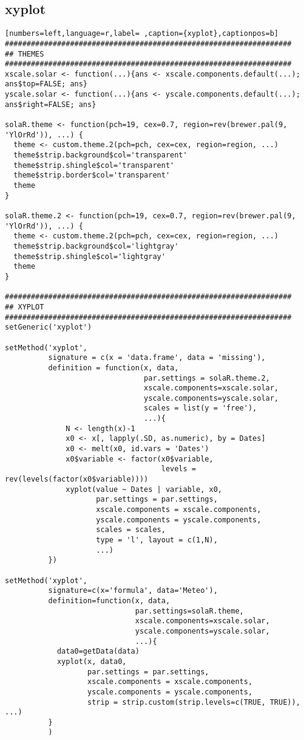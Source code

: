 \subsection{xyplot}
\label{sec:org18348e4}
\begin{lstlisting}[numbers=left,language=r,label= ,caption={xyplot},captionpos=b]
##################################################################
## THEMES
##################################################################
xscale.solar <- function(...){ans <- xscale.components.default(...); ans$top=FALSE; ans}
yscale.solar <- function(...){ans <- yscale.components.default(...); ans$right=FALSE; ans}

solaR.theme <- function(pch=19, cex=0.7, region=rev(brewer.pal(9, 'YlOrRd')), ...) {
  theme <- custom.theme.2(pch=pch, cex=cex, region=region, ...)
  theme$strip.background$col='transparent'
  theme$strip.shingle$col='transparent'
  theme$strip.border$col='transparent'
  theme
}

solaR.theme.2 <- function(pch=19, cex=0.7, region=rev(brewer.pal(9, 'YlOrRd')), ...) {
  theme <- custom.theme.2(pch=pch, cex=cex, region=region, ...)
  theme$strip.background$col='lightgray'
  theme$strip.shingle$col='lightgray'
  theme
}

##################################################################
## XYPLOT
##################################################################
setGeneric('xyplot')

setMethod('xyplot',
          signature = c(x = 'data.frame', data = 'missing'),
          definition = function(x, data,
                                par.settings = solaR.theme.2,
                                xscale.components=xscale.solar,
                                yscale.components=yscale.solar,
                                scales = list(y = 'free'),
                                ...){
              N <- length(x)-1
              x0 <- x[, lapply(.SD, as.numeric), by = Dates]
              x0 <- melt(x0, id.vars = 'Dates')
              x0$variable <- factor(x0$variable,
                                    levels = rev(levels(factor(x0$variable))))
              xyplot(value ~ Dates | variable, x0,
                     par.settings = par.settings,
                     xscale.components = xscale.components,
                     yscale.components = yscale.components,
                     scales = scales,
                     type = 'l', layout = c(1,N),
                     ...)
          })

setMethod('xyplot',
          signature=c(x='formula', data='Meteo'),
          definition=function(x, data,
                              par.settings=solaR.theme,
                              xscale.components=xscale.solar,
                              yscale.components=yscale.solar,
                              ...){
            data0=getData(data)
            xyplot(x, data0,
                   par.settings = par.settings,
                   xscale.components = xscale.components,
                   yscale.components = yscale.components,
                   strip = strip.custom(strip.levels=c(TRUE, TRUE)), ...)
          }
          )


\end{lstlisting}
